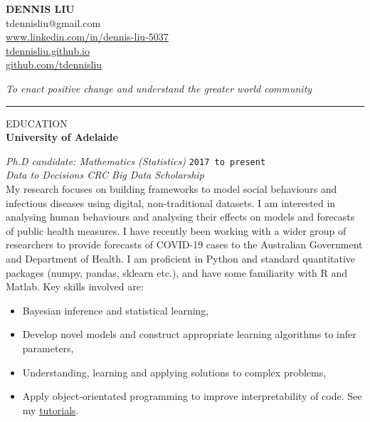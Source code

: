 \documentclass{article}
\newcommand{\HRule}{\rule{\linewidth}{0.5mm}}
\begin{document}
\begin{center} 

\textbf{\huge{DENNIS LIU}}
\\[0.5cm]

tdennisliu@gmail.com \\
\url{www.linkedin.com/in/dennis-liu-5037} \\
\url{tdennisliu.github.io}\\
\small{\url{github.com/tdennisliu}}

\end{center}
\emph{To enact positive change and understand the greater world community} 


\HRule

{\footnotesize EDUCATION}
\\

\textbf{\large University of Adelaide} 

\emph{Ph.D candidate: Mathematics (Statistics)} \hfill \texttt{2017 to present}\\[0.2cm]
\footnotesize{\emph{Data to Decisions CRC Big Data Scholarship}}\\

My research focuses on building frameworks to model social behaviours and infectious diseases using digital, non-traditional datasets. I am interested in analysing human behaviours and analysing their effects on models and forecasts of public health measures. I have recently been working with a wider group of researchers to provide forecasts of COVID-19 cases to the Australian Government and Department of Health. I am proficient in Python and standard quantitative packages (numpy, pandas, sklearn etc.), and have some familiarity with R and Matlab.
\hypersetup{urlcolor=black}
Key skills involved are:

\begin{itemize}
	\item Bayesian inference and statistical learning,
	\item Develop novel models and construct appropriate learning algorithms to infer parameters,
	\item Understanding, learning and applying solutions to complex problems,
	\item Apply object-orientated programming to improve interpretability of code. See my \href{https://tdennisliu.github.io/tutorials/1-simple-search-and-recursion.html#Towers-of-Hanoi}{tutorials}.
\end{itemize}
\end{document}
